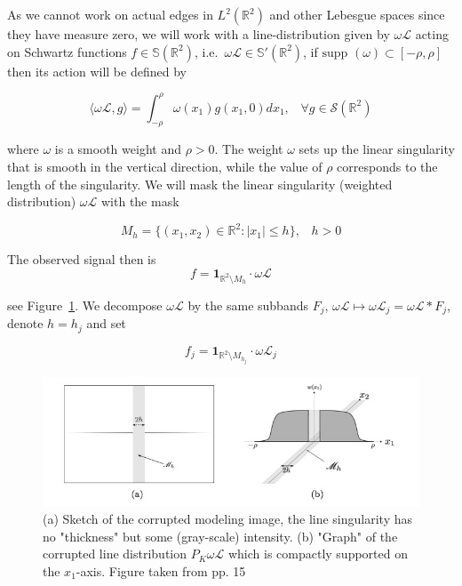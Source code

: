 \bigskip

As we cannot work on actual edges in $L^2(\mathbb{R}^2)$ and other Lebesgue spaces since they have measure zero, we will work with a line-distribution given by $\omega\mathcal{L}$ acting on Schwartz functions $f\in\mathbb{S}(\mathbb{R}^2)$, i.e.\ $\omega\mathcal{L}\in \mathbb{S}'(\mathbb{R}^2)$, if $\text{supp }(\omega)\subset[-\rho,\rho]$ then its action will be defined by

$$
\langle \omega \mathcal{L},g\rangle = \int_{-\rho}^{\rho} \omega(x_1)g(x_1,0)dx_1 \textrm{,}\quad \forall g\in\mathcal{S}(\mathbb{R}^2)
$$

where $\omega$ is a smooth weight and $\rho>0$. The weight $\omega$ sets up the linear singularity that is smooth in the vertical direction, while the value of $\rho$ corresponds to the length of the singularity. We will mask the linear singularity (weighted distribution) $\omega\mathcal{L}$ with the mask 

$$
M_h=\{(x_1,x_2)\in\mathbb{R}^2:|x_1|\leq h\}\textrm{,}\quad h>0
$$

The observed signal then is 
$$
f=\mathbf{1}_{\mathbb{R}^2\setminus M_h}\cdot \omega\mathcal{L}
$$ 

see Figure~\ref{fig:alpha6}. We decompose $\omega\mathcal{L}$ by the same subbands $F_j$, $\omega\mathcal{L}\mapsto \omega\mathcal{L}_j=\omega\mathcal{L}*F_j$, denote $h=h_j$ and set 

$$
f_j=\mathbf{1}_{\mathbb{R}^2\setminus M_{h_j}}\cdot \omega\mathcal{L}_j
$$

\begin{figure}[h!]
\centering
\includegraphics[width = 0.9 \textwidth]{./Diagrams/alpha6.jpg}
\caption{(a) Sketch of the corrupted modeling image, the line singularity has no "thickness" but some (gray-scale) intensity. (b) "Graph" of the corrupted line distribution $P_K\omega\mathcal{L}$ which is compactly supported on the $x_1$-axis. Figure taken from \cite{Gitta-alpha} pp. 15}
\label{fig:alpha6}
\end{figure}

\bigskip

